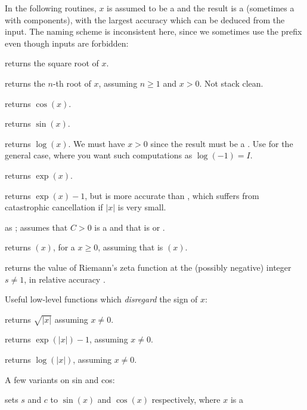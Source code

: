 In the following routines, $x$ is assumed to be a  and the result
is a  (sometimes a  with  components), with
the largest accuracy which can be deduced from the input. The naming scheme
is inconsistent here, since we sometimes use the prefix  even though
 inputs are forbidden:

 returns the square root of $x$.

 returns the $n$-th root of $x$, assuming
$n\geq 1$ and $x > 0$. Not stack clean.

 returns $\cos(x)$.

 returns $\sin(x)$.

 returns $\log(x)$. We must have $x > 0$
since the result must be a . Use  for the general case,
where you want such computations as $\log(-1) = I$.

 returns $\exp(x)$.

 returns $\exp(x)-1$, but is more accurate than
, which suffers from catastrophic cancellation if
$|x|$ is very small.

 as ; assumes
that $C > 0$ is a  and that  is  or .

 returns $(x)$, for a 
$x\geq 0$, assuming that  is $(x)$.

 returns the value of Riemann's zeta
function at the (possibly negative) integer $s\neq 1$, in relative accuracy .

\noindent Useful low-level functions which \emph{disregard} the sign of $x$:

 returns $\sqrt{|x|}$ assuming $x\neq 0$.

 returns $\exp(|x|) - 1$, assuming $x \neq 0$.

 returns $\log(|x|)$, assuming $x \neq 0$.

\noindent A few variants on sin and cos:

 sets $s$ and $c$ to
$\sin(x)$ and $\cos(x)$ respectively, where $x$ is a 

